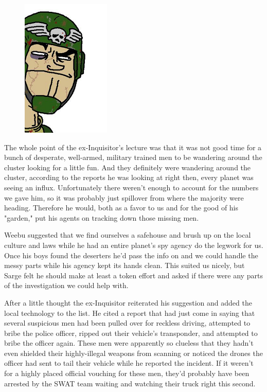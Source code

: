\begin{figure}
	\begin{center}
		\includegraphics[width=\figwidth]{pics/10/18.png}
	\end{center}
\end{figure}
The whole point of the ex-Inquisitor's lecture was that it was not good time for a bunch of desperate, well-armed, military trained men to be wandering around the cluster looking for a little fun. 
And they definitely were wandering around the cluster, according to the reports he was looking at right then, every planet was seeing an influx. 
Unfortunately there weren't enough to account for the numbers we gave him, so it was probably just spillover from where the majority were heading. 
Therefore he would, both as a favor to us and for the good of his "garden," put his agents on tracking down those missing men.

Weebu suggested that we find ourselves a safehouse and brush up on the local culture and laws while he had an entire planet's spy agency do the legwork for us. 
Once his boys found the deserters he'd pass the info on and we could handle the messy parts while his agency kept its hands clean. 
This suited us nicely, but Sarge felt he should make at least a token effort and asked if there were any parts of the investigation we could help with. 


After a little thought the ex-Inquisitor reiterated his suggestion and added the local technology to the list. 
He cited a report that had just come in saying that several suspicious men had been pulled over for reckless driving, attempted to bribe the police officer, ripped out their vehicle's transponder, and attempted to bribe the officer again. 
These men were apparently so clueless that they hadn't even shielded their highly-illegal weapons from scanning or noticed the drones the officer had sent to tail their vehicle while he reported the incident. 
If it weren't for a highly placed official vouching for these men, they'd probably have been arrested by the SWAT team waiting and watching their truck right this second.

